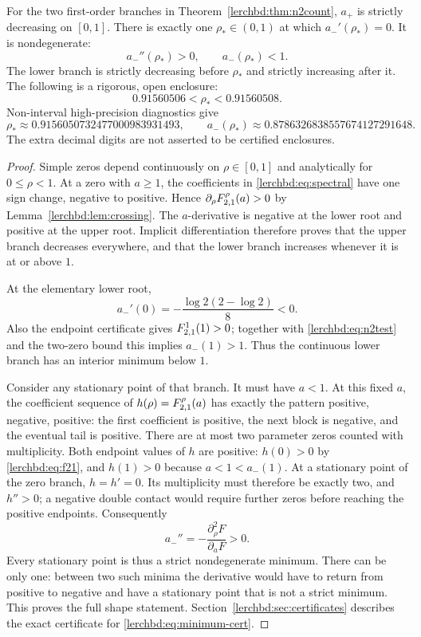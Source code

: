 \begin{theorem}\label{lerchbd:thm:n2shape}
For the two first-order branches in Theorem~\ref{lerchbd:thm:n2count}, $a_+$ is strictly decreasing on $[0,1]$. There is exactly one $\rho_*\in(0,1)$ at which $a_-'(\rho_*)=0$. It is nondegenerate:
\[
 a_-''(\rho_*)>0,\qquad a_-(\rho_*)<1.
\]
The lower branch is strictly decreasing before $\rho_*$ and strictly increasing after it. The following is a rigorous, open enclosure:
\begin{equation}\label{lerchbd:eq:minimum-cert}
 0.91560506<\rho_*<0.91560508.
\end{equation}
Non-interval high-precision diagnostics give
\[
 \rho_*\approx0.9156050732477000983931493,
 \qquad a_-(\rho_*)\approx0.8786326838557674127291648.
\]
The extra decimal digits are not asserted to be certified enclosures.
\end{theorem}
\begin{proof}
Simple zeros depend continuously on $\rho\in[0,1]$ and analytically for $0\le\rho<1$. At a zero with $a\ge1$, the coefficients in \eqref{lerchbd:eq:spectral} have one sign change, negative to positive. Hence $\partial_\rho F_{2,1}^{\rho}(a)>0$ by Lemma~\ref{lerchbd:lem:crossing}. The $a$-derivative is negative at the lower root and positive at the upper root. Implicit differentiation therefore proves that the upper branch decreases everywhere, and that the lower branch increases whenever it is at or above $1$.

At the elementary lower root,
\begin{equation}\label{lerchbd:eq:initial-slope}
 a_-'(0)=-\frac{\log2(2-\log2)}8<0.
\end{equation}
Also the endpoint certificate gives $F_{2,1}^{1}(1)>0$; together with \eqref{lerchbd:eq:n2test} and the two-zero bound this implies $a_-(1)>1$. Thus the continuous lower branch has an interior minimum below $1$.

Consider any stationary point of that branch. It must have $a<1$. At this fixed $a$, the coefficient sequence of $h(\rho)=F_{2,1}^{\rho}(a)$ has exactly the pattern positive, negative, positive: the first coefficient is positive, the next block is negative, and the eventual tail is positive. There are at most two parameter zeros counted with multiplicity. Both endpoint values of $h$ are positive: $h(0)>0$ by \eqref{lerchbd:eq:f21}, and $h(1)>0$ because $a<1<a_-(1)$. At a stationary point of the zero branch, $h=h'=0$. Its multiplicity must therefore be exactly two, and $h''>0$; a negative double contact would require further zeros before reaching the positive endpoints. Consequently
\[
 a_-''=-\frac{\partial_\rho^2F}{\partial_aF}>0.
\]
Every stationary point is thus a strict nondegenerate minimum. There can be only one: between two such minima the derivative would have to return from positive to negative and have a stationary point that is not a strict minimum. This proves the full shape statement. Section~\ref{lerchbd:sec:certificates} describes the exact certificate for \eqref{lerchbd:eq:minimum-cert}.
\end{proof}

